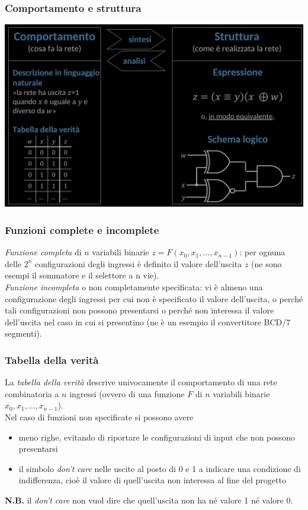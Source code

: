 \documentclass{article}
\begin{document}
\subsubsection*{Comportamento e struttura}
\begin{center}
    \includegraphics[scale=0.35]{compstr.png}
\end{center}
\subsubsection{Funzioni complete e incomplete}
\textit{Funzione completa} di $n$ variabili binarie $z = F(x_0,x_1,...,x_{n-1})$: per ognuna delle $2^n$ configurazioni degli ingressi è definito il valore dell'uscita $z$ (ne sono esempi il sommatore e il selettore a n vie). 
\vspace{0.2cm}\\
\textit{Funzione incompleta} o non completamente specificata: vi è almeno una configurazione degli ingressi per cui non è specificato il valore dell’uscita, o perché tali configurazioni non possono presentarsi o perché non interessa il valore dell’uscita nel caso in cui si presentino (ne è un esempio il convertitore BCD/7 segmenti).
\subsubsection{Tabella della verità}
La \textit{tabella della verità} descrive univocamente il comportamento di una rete combinatoria a $n$ ingressi (ovvero di una funzione $F$ di $n$ variabili binarie $x_0,x_1,...,x_{n-1}$).
\vspace{0.1cm}\\
Nel caso di funzioni non specificate si possono avere
\begin{itemize}
    \item meno righe, evitando di riportare le configurazioni di input che non possono presentarsi
    \item il simbolo \textit{don't care} nelle uscite al posto di 0 e 1 a indicare una condizione di indifferenza, cioè il valore di quell'uscita non interessa al fine del progetto
\end{itemize}
\textbf{N.B.} il \textit{don't care} non vuol dire che quell'uscita non ha né valore 1 né valore 0.
\end{document}
